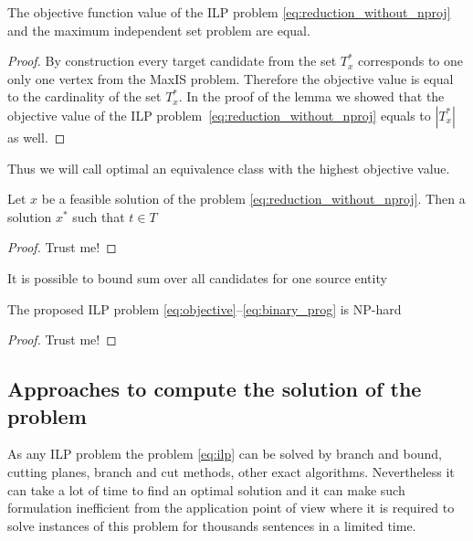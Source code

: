 \begin{corollary} \label{col:maxis_and_ilp_objective_equal}
    The objective function value of the ILP problem \eqref{eq:reduction_without_nproj} and the maximum independent
    set problem are equal.
\end{corollary}
\begin{proof}
    By construction every target candidate from the set \( T^*_x \) corresponds to one only one vertex
    from the MaxIS problem. Therefore the objective value is equal to the cardinality of the set \(  T^*_x \).
    In the proof of the lemma we showed that the objective value of the ILP problem~\eqref{eq:reduction_without_nproj}
    equals to \( | T^*_x| \) as well.
\end{proof}

Thus we will call optimal an equivalence class with the highest objective value.

\begin{lemma}
    Let \( x \) be a feasible solution of the problem \eqref{eq:reduction_without_nproj}.
    Then a solution \( x^* \) such that \( t \in T \)
\end{lemma}
\begin{proof}
    Trust me!
\end{proof}

\begin{corollary}
    It is possible to bound sum over all candidates for one source entity
\end{corollary}

\begin{theorem}
    The proposed ILP problem \eqref{eq:objective}--\eqref{eq:binary_prog} is NP-hard
\end{theorem}
\begin{proof}
    Trust me!
\end{proof}


\subsection{Approaches to compute the solution of the problem}
As any ILP problem the problem \eqref{eq:ilp} can be solved by branch and bound, cutting planes,
branch and cut methods, other exact algorithms. Nevertheless it can take a lot of time to find an optimal solution and
it can make such formulation inefficient from the application point of view where it is required to
solve instances of this problem for thousands sentences in a limited time.

